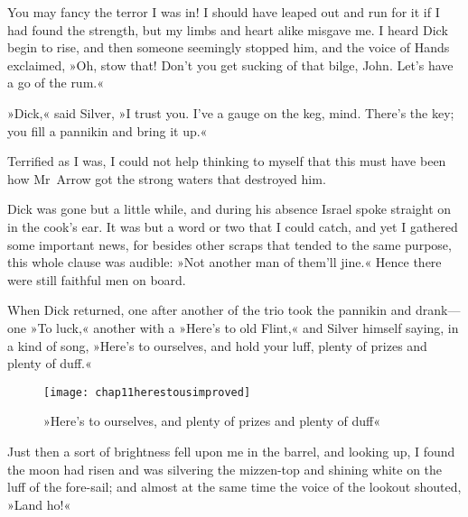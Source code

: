 You may fancy the terror I was in! I should have leaped out and run for it if I had found the strength, but my limbs and heart alike misgave me. I heard Dick begin to rise, and then someone seemingly stopped him, and the voice of Hands exclaimed, »Oh, stow that! Don't you get sucking of that bilge, John. Let's have a go of the rum.«

»Dick,« said Silver, »I trust you. I've a gauge on the keg, mind. There's the key; you fill a pannikin and bring it up.«

Terrified as I was, I could not help thinking to myself that this must have been how Mr~Arrow got the strong waters that destroyed him.

Dick was gone but a little while, and during his absence Israel spoke straight on in the cook's ear. It was but a word or two that I could catch, and yet I gathered some important news, for besides other scraps that tended to the same purpose, this whole clause was audible: »Not another man of them'll jine.« Hence there were still faithful men on board.

When Dick returned, one after another of the trio took the pannikin and drank—one »To luck,« another with a »Here's to old Flint,« and Silver himself saying, in a kind of song, »Here's to ourselves, and hold your luff, plenty of prizes and plenty of duff.«

 \begin{figure}[p]
\centering
\texttt{[image: chap11herestousimproved]}
\caption[»Here's to ourselves«]{»Here's to ourselves, and plenty of prizes and plenty of duff«}
\end{figure}

Just then a sort of brightness fell upon me in the barrel, and looking up, I found the moon had risen and was silvering the mizzen-top and shining white on the luff of the fore-sail; and almost at the same time the voice of the lookout shouted, »Land ho!«
